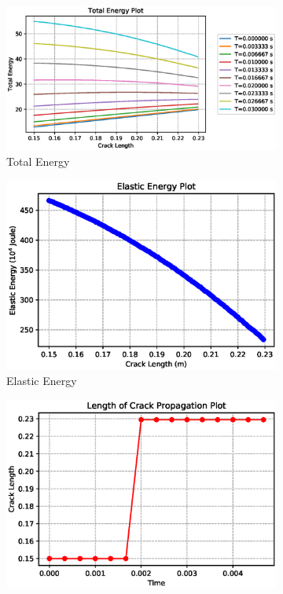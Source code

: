 \documentclass[a4paper,11pt]{article}
\begin{document}
\begin{figure}[h!]
	\begin{subfigure}[b]{\linewidth}
		\centering
		\includegraphics[width=\linewidth]{picture/conference/totalenergycase}
		\caption{Total Energy}
		\label{fig:totalenergycase}
	\end{subfigure}
	\quad
	\begin{subfigure}[b]{0.49\linewidth}
		\centering
		\includegraphics[width=\linewidth]{picture/conference/elasticcase}
		\caption{Elastic Energy}
		\label{fig:elasticcase}
	\end{subfigure}
	\quad
	\begin{subfigure}[b]{0.49\linewidth}
		\centering
		\includegraphics[width=\linewidth]{picture/conference/cracklengthcase}

\end{subfigure}
\end{figure}
\end{document}
